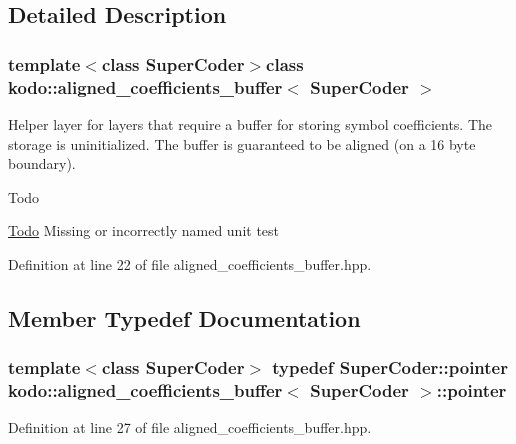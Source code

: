 \subsection{Detailed Description}
\subsubsection*{template$<$class Super\-Coder$>$class kodo\-::aligned\-\_\-coefficients\-\_\-buffer$<$ Super\-Coder $>$}

Helper layer for layers that require a buffer for storing symbol coefficients. The storage is uninitialized. The buffer is guaranteed to be aligned (on a 16 byte boundary). 

\begin{DoxyRefDesc}{Todo}
\item[\hyperlink{todo__todo000001}{Todo}]Missing or incorrectly named unit test \end{DoxyRefDesc}


Definition at line 22 of file aligned\-\_\-coefficients\-\_\-buffer.\-hpp.



\subsection{Member Typedef Documentation}
\hypertarget{classkodo_1_1aligned__coefficients__buffer_acb8a6277e85aec287e8d55b75d9d194f}{
\subsubsection[{pointer}]{\setlength{\rightskip}{0pt plus 5cm}template$<$class Super\-Coder$>$ typedef Super\-Coder\-::pointer {\bf kodo\-::aligned\-\_\-coefficients\-\_\-buffer}$<$ Super\-Coder $>$\-::{\bf pointer}}}\label{classkodo_1_1aligned__coefficients__buffer_acb8a6277e85aec287e8d55b75d9d194f}






Definition at line 27 of file aligned\-\_\-coefficients\-\_\-buffer.\-hpp.




